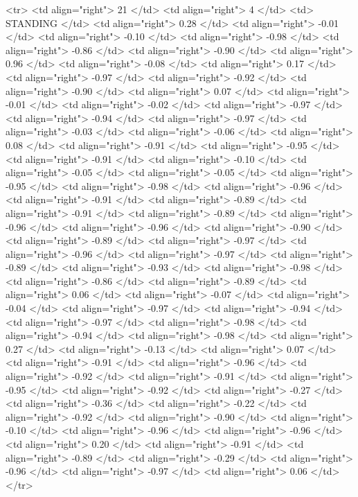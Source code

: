   <tr> <td align="right"> 21 </td> <td align="right">   4 </td> <td> STANDING </td> <td align="right"> 0.28 </td> <td align="right"> -0.01 </td> <td align="right"> -0.10 </td> <td align="right"> -0.98 </td> <td align="right"> -0.86 </td> <td align="right"> -0.90 </td> <td align="right"> 0.96 </td> <td align="right"> -0.08 </td> <td align="right"> 0.17 </td> <td align="right"> -0.97 </td> <td align="right"> -0.92 </td> <td align="right"> -0.90 </td> <td align="right"> 0.07 </td> <td align="right"> -0.01 </td> <td align="right"> -0.02 </td> <td align="right"> -0.97 </td> <td align="right"> -0.94 </td> <td align="right"> -0.97 </td> <td align="right"> -0.03 </td> <td align="right"> -0.06 </td> <td align="right"> 0.08 </td> <td align="right"> -0.91 </td> <td align="right"> -0.95 </td> <td align="right"> -0.91 </td> <td align="right"> -0.10 </td> <td align="right"> -0.05 </td> <td align="right"> -0.05 </td> <td align="right"> -0.95 </td> <td align="right"> -0.98 </td> <td align="right"> -0.96 </td> <td align="right"> -0.91 </td> <td align="right"> -0.89 </td> <td align="right"> -0.91 </td> <td align="right"> -0.89 </td> <td align="right"> -0.96 </td> <td align="right"> -0.96 </td> <td align="right"> -0.90 </td> <td align="right"> -0.89 </td> <td align="right"> -0.97 </td> <td align="right"> -0.96 </td> <td align="right"> -0.97 </td> <td align="right"> -0.89 </td> <td align="right"> -0.93 </td> <td align="right"> -0.98 </td> <td align="right"> -0.86 </td> <td align="right"> -0.89 </td> <td align="right"> 0.06 </td> <td align="right"> -0.07 </td> <td align="right"> -0.04 </td> <td align="right"> -0.97 </td> <td align="right"> -0.94 </td> <td align="right"> -0.97 </td> <td align="right"> -0.98 </td> <td align="right"> -0.94 </td> <td align="right"> -0.98 </td> <td align="right"> 0.27 </td> <td align="right"> -0.13 </td> <td align="right"> 0.07 </td> <td align="right"> -0.91 </td> <td align="right"> -0.96 </td> <td align="right"> -0.92 </td> <td align="right"> -0.91 </td> <td align="right"> -0.95 </td> <td align="right"> -0.92 </td> <td align="right"> -0.27 </td> <td align="right"> -0.36 </td> <td align="right"> -0.22 </td> <td align="right"> -0.92 </td> <td align="right"> -0.90 </td> <td align="right"> -0.10 </td> <td align="right"> -0.96 </td> <td align="right"> -0.96 </td> <td align="right"> 0.20 </td> <td align="right"> -0.91 </td> <td align="right"> -0.89 </td> <td align="right"> -0.29 </td> <td align="right"> -0.96 </td> <td align="right"> -0.97 </td> <td align="right"> 0.06 </td> </tr>
